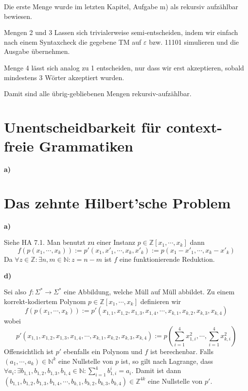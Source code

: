 \documentclass[a4paper,graphics,11pt]{article}
\newcommand{\eps}[0]{\varepsilon}
\begin{document}
Die erste Menge wurde im letzten Kapitel, Aufgabe m) als rekursiv aufzählbar bewiesen.

Mengen 2 und 3 Lassen sich trivialerweise semi-entscheiden, indem wir einfach nach einem Syntaxcheck
die gegebene TM auf $\eps$ bzw. 11101 simulieren und die Ausgabe übernehmen.

Menge 4 lässt sich analog zu 1 entscheiden, nur dass wir erst akzeptieren, sobald mindestens 3 Wörter
akzeptiert wurden.

Damit sind alle übrig-gebliebenen Mengen rekursiv-aufzählbar.

\newpage

\section{Unentscheidbarkeit für context-freie Grammatiken}

\textbf{a)}

\newpage

\section{Das zehnte Hilbert'sche Problem}

\textbf{a)}

Siehe HA 7.1. Man benutzt zu einer Instanz $p \in \mathbb{Z}[x_1,\cdots,x_k]$ dann
$$
    f(p(x_1,\cdots,x_k))
    := p'(x_1,x'_1,\cdots,x_k,x'_k)
    := p(x_1 - x'_1, \cdots, x_k - x'_k)
$$
Da $\forall z \in \mathbb{Z}: \exists n,m \in \mathbb{N} : z = n-m$ ist $f$ eine funktionierende Reduktion.

\strut

\textbf{d)}

Sei also $f : \Sigma^* \to \Sigma^*$ eine Abbildung, welche Müll auf Müll abbildet. Zu einem korrekt-kodiertem
Polynom $p \in \mathbb{Z}[x_1,\cdots,x_k]$ definieren wir
$$
    f(p(x_1,\cdots,x_k)) := p'(x_{1,1},x_{1,2},x_{1,3},x_{1,4},\cdots,x_{k,1},x_{k,2},x_{k,3},x_{k,4})
$$
wobei
$$
    p'(x_{1,1},x_{1,2},x_{1,3},x_{1,4},\cdots,x_{k,1},x_{k,2},x_{k,3},x_{k,4})
    := p(\sum_{i=1}^{4} x_{1,i}^2, \cdots ,\sum_{i=1}^{4} x_{k,i}^2)
$$
Offensichtlich ist $p'$ ebenfalls ein Polynom und $f$ ist berechenbar. Falls $(a_1,\cdots,a_k) \in \mathbb{N}^k$
eine Nullstelle von $p$ ist, so gilt nach Lagrange, dass $\forall a_i: \exists b_{1,1},b_{1,2},b_{1,3},b_{1,4} \in \mathbb{N}: \sum_{i=1}^{4} b_{1,i}^i = a_i$.
Damit ist dann $(b_{1,1},b_{1,2},b_{1,3},b_{1,4},\cdots,b_{k,1},b_{k,2},b_{k,3},b_{k,4}) \in \mathbb{Z}^{4k}$
eine Nullstelle von $p'$.
\end{document}
